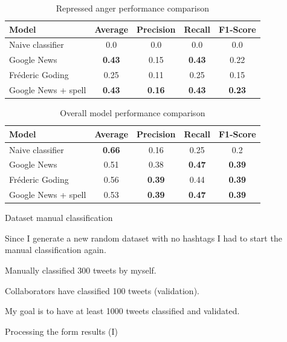 \begin{table}[!htp]
\centering
\begin{tabular}{ l|c|c|c|c }
\hline
Model & Average & Precision & Recall & F1-Score  \\ \hline
Naive classifier    & 0.0           & 0.0           & 0.0  & 0.0 \\
Google News         & \textbf{0.43} & 0.15          & \textbf{0.43} & 0.22 \\
Fréderic Goding     & 0.25          & 0.11          & 0.25          & 0.15 \\
Google News + spell & \textbf{0.43} & \textbf{0.16} & \textbf{0.43} & \textbf{0.23} \\
\hline
\end{tabular}
\caption{Repressed anger performance comparison}
\label{tab:represed_anger_performance}
\end{table}

\begin{table}[!htp]
\centering
\begin{tabular}{ l|c|c|c|c }
\hline
Model & Average & Precision & Recall & F1-Score  \\ \hline
Naive classifier    & \textbf{0.66} & 0.16          & 0.25 & 0.2 \\
Google News         & 0.51          & 0.38          & \textbf{0.47} & \textbf{0.39} \\
Fréderic Goding     & 0.56          & \textbf{0.39} & 0.44          & \textbf{0.39} \\
Google News + spell & 0.53          & \textbf{0.39} & \textbf{0.47} & \textbf{0.39} \\
\hline
\end{tabular}
\caption{Overall model performance comparison}
\label{tab:overall_performance}
\end{table}

\iffalse

Dataset manual classification

Since I generate a new random dataset with no hashtags I had to start the manual classification again.

Manually classified 300 tweets by myself. 

Collaborators have classified 100 tweets (validation).

My goal is to have at least 1000 tweets classified and validated.

Processing the form results (I)

